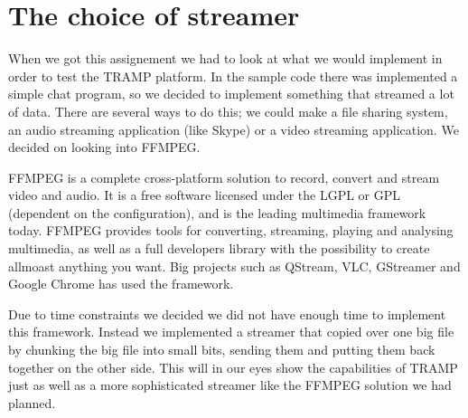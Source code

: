 
\section{The choice of streamer}
\label{sec:streamer}
When we got this assignement we had to look at what we would implement in order to test the TRAMP platform. In the sample code there was implemented a simple chat program, so we decided to implement something that streamed a lot of data. There are several ways to do this; we could make a file sharing system, an audio streaming application (like Skype) or a video streaming application. We decided on looking into FFMPEG.

FFMPEG is a complete cross-platform solution to record, convert and stream video and audio. It is a free software licensed under the LGPL or GPL (dependent on the configuration), and is the leading multimedia framework today.
FFMPEG provides tools for converting, streaming, playing and analysing multimedia, as well as a full developers library with the possibility to create allmoast anything you want. Big projects such as QStream, VLC, GStreamer and Google Chrome has used the framework.

Due to time constraints we decided we did not have enough time to implement this framework. Instead we implemented a streamer that copied over one big file by chunking the big file into small bits, sending them and putting them back together on the other side. This will in our eyes show the capabilities of TRAMP just as well as a more sophisticated streamer like the FFMPEG solution we had planned.
